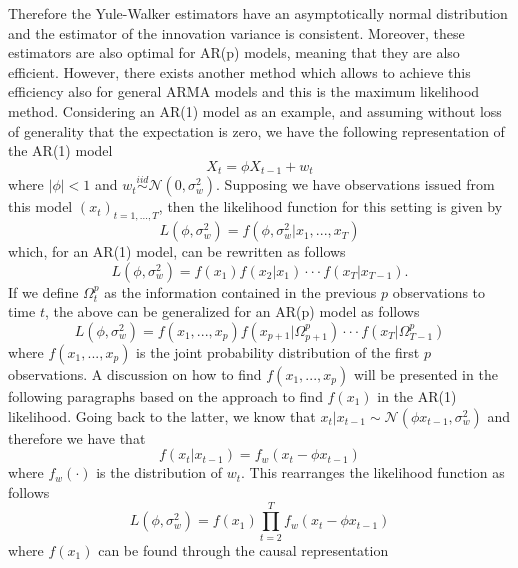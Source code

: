 \documentclass[]{book}
\theoremstyle{definition}
\theoremstyle{definition}
\theoremstyle{definition}
\theoremstyle{remark}
\begin{document}
{Therefore the Yule-Walker estimators have an asymptotically normal
distribution and the estimator of the innovation variance is consistent.
Moreover, these estimators are also optimal for AR(p) models, meaning
that they are also efficient. However, there exists another method which
allows to achieve this efficiency also for general ARMA models and this
is the maximum likelihood method. Considering an AR(1) model as an
example, and assuming without loss of generality that the expectation is
zero, we have the following representation of the AR(1) model
\begin{equation*}
X_t = \phi X_{t-1} + w_t
\end{equation*} where \(|\phi|<1\) and
\(w_t \overset{iid}{\sim} \mathcal{N}(0,\sigma_w^2)\). Supposing we have
observations issued from this model \((x_t)_{t=1,...,T}\), then the
likelihood function for this setting is given by \begin{equation*}
L(\phi,\sigma_w^2) = f(\phi,\sigma_w^2|x_1,...,x_T)
\end{equation*} which, for an AR(1) model, can be rewritten as follows
\begin{equation*}
L(\phi,\sigma_w^2) = f(x_1)f(x_2|x_1)\cdot \cdot \cdot f(x_T|x_{T-1}).
\end{equation*} If we define \(\Omega_t^p\) as the information contained
in the previous \(p\) observations to time \(t\), the above can be
generalized for an AR(p) model as follows \begin{equation*}
L(\phi,\sigma_w^2) = f(x_1,...,x_p)f(x_{p+1}|\Omega_{p+1}^p)\cdot \cdot \cdot f(x_T|\Omega_{T-1}^p)
\end{equation*} where \(f(x_1,...,x_p)\) is the joint probability
distribution of the first \(p\) observations. A discussion on how to
find \(f(x_1,...,x_p)\) will be presented in the following paragraphs
based on the approach to find \(f(x_1)\) in the AR(1) likelihood. Going
back to the latter, we know that
\(x_t|x_{t-1} \sim \mathcal{N}(\phi x_{t-1},\sigma_w^2)\) and therefore
we have that \begin{equation*}
f(x_t|x_{t-1}) = f_w(x_t - \phi x_{t-1})
\end{equation*} where \(f_w(\cdot)\) is the distribution of \(w_t\).
This rearranges the likelihood function as follows \begin{equation*}
L(\phi,\sigma_w^2) = f(x_1)\prod_{t=2}^T f_w(x_t - \phi x_{t-1})
\end{equation*} where \(f(x_1)\) can be found through the causal
representation \begin{equation*}

\end{equation*}}
\end{document}
